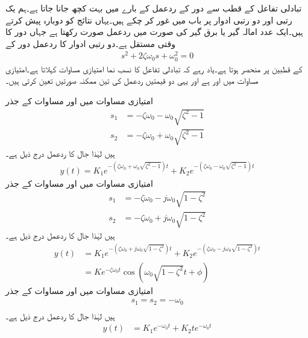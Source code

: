 تبادلی تفاعل کے قطب سے دور کے ردعمل کے بارے میں بہت کچھ جانا جاتا ہے۔ہم یک رتبی اور دو رتبی ادوار پر باب  میں غور کر چکے ہیں۔یہاں نتائج کو دوبارہ پیش کرتے ہیں۔ایک عدد امالہ گیر یا برق گیر کی صورت میں ردعمل  صورت رکھتا ہے جہاں  دور کا وقتی مستقل ہے۔دو رتبی ادوار کا ردعمل دور کے 
\begin{align*}
s^2+2\zeta \omega_0 s+\omega_0^2=0
\end{align*}
کے قطبین پر منحصر ہوتا ہے۔یاد رہے کہ تبادلی تفاعل کا نسب نما امتیازی مساوات کہلاتا ہے۔امتیازی مساوات میں   اور   ہے اور یہی دو قیمتیں ردعمل کی تین ممکنہ صورتیں تعین کرتی ہیں۔
\begin{description}
 امتیازی مساوات میں  اور مساوات  کے جذر
\begin{align*}
s_1&=-\zeta\omega_0-\omega_0\sqrt{\zeta^2-1}\\
s_2&=-\zeta\omega_0+\omega_0\sqrt{\zeta^2-1}
\end{align*}
ہیں لہٰذا جال کا ردعمل درج ذیل ہے۔
\begin{align*}
y(t)=K_1e^{-(\zeta\omega_0+\omega_0\sqrt{\zeta^2-1})t}+K_2e^{-(\zeta\omega_0-\omega_0\sqrt{\zeta^2-1})t}
\end{align*}
 امتیازی مساوات میں  اور مساوات  کے جذر
\begin{align*}
s_1&=-\zeta\omega_0-j\omega_0\sqrt{1-\zeta^2}\\
s_2&=-\zeta\omega_0+j\omega_0\sqrt{1-\zeta^2}
\end{align*}
ہیں لہٰذا جال کا ردعمل درج ذیل ہے۔
\begin{align*}
y(t)&=K_1e^{-(\zeta\omega_0+j\omega_0\sqrt{1-\zeta^2})t}+K_2e^{-(\zeta\omega_0-j\omega_0\sqrt{1-\zeta^2})t}\\
&=Ke^{-\zeta \omega_0 t} \cos (\omega_0\sqrt{1-\zeta^2} t+\phi)
\end{align*}
 امتیازی مساوات میں  اور مساوات  کے جذر
\begin{align*}
s_1=s_2=-\omega_0\\
\end{align*}
ہیں لہٰذا جال کا ردعمل درج ذیل ہے۔
\begin{align*}
y(t)&=K_1e^{-\omega_0 t}+K_2 te^{-\omega_0 t}
\end{align*}
\end{description}

